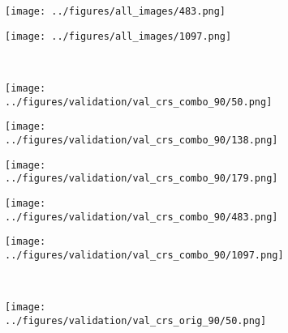 \begin{figure}[h!]
\begin{subfigure}{0.18\textwidth}
		\centering
		\texttt{[image: ../figures/all\_images/483.png]}
		\label{fig:1}
	\end{subfigure}
	\begin{subfigure}{0.18\textwidth}
		\centering
		\texttt{[image: ../figures/all\_images/1097.png]}
		\label{fig:1}
	\end{subfigure}
	\vspace{-0.35cm}
	\\
		\begin{subfigure}[b]{0.03\textwidth} %
		\centering
	\end{subfigure}
	\hspace{0.05cm}
	\begin{subfigure}{0.18\textwidth}
		\centering
		\texttt{[image: ../figures/validation/val\_crs\_combo\_90/50.png]}
		\label{fig:1}
	\end{subfigure}
	\begin{subfigure}{0.18\textwidth}
		\centering
		\texttt{[image: ../figures/validation/val\_crs\_combo\_90/138.png]}
		\label{fig:1}
	\end{subfigure}
	\begin{subfigure}{0.18\textwidth}
		\centering
		\texttt{[image: ../figures/validation/val\_crs\_combo\_90/179.png]}
		\label{fig:1}
	\end{subfigure}
	\begin{subfigure}{0.18\textwidth}
		\centering
		\texttt{[image: ../figures/validation/val\_crs\_combo\_90/483.png]}
		\label{fig:1}
	\end{subfigure}
	\begin{subfigure}{0.18\textwidth}
		\centering
		\texttt{[image: ../figures/validation/val\_crs\_combo\_90/1097.png]}
		\label{fig:1}
	\end{subfigure}
		\vspace{-0.35cm}
	\\
	\begin{subfigure}[b]{0.03\textwidth} %
		\centering
	\end{subfigure}
	\hspace{0.05cm}
	\begin{subfigure}{0.18\textwidth}
		\centering
		\texttt{[image: ../figures/validation/val\_crs\_orig\_90/50.png]}

\end{subfigure}
\end{figure}

